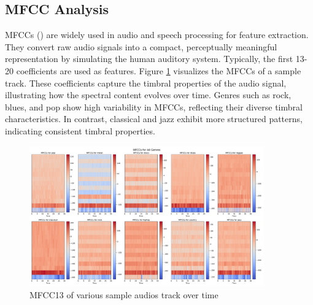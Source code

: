 \documentclass[11.5pt]{article}
\begin{document}
\subsection{MFCC Analysis}
MFCCs () are widely used in audio and speech processing for feature extraction. They convert raw audio signals into a compact, perceptually meaningful representation by simulating the human auditory system. Typically, the first 13-20 coefficients are used as features. Figure \ref{fig:mfcc} visualizes the MFCCs of a sample track. These coefficients capture the timbral properties of the audio signal, illustrating how the spectral content evolves over time. Genres such as rock, blues, and pop show high variability in MFCCs, reflecting their diverse timbral characteristics. In contrast, classical and jazz exhibit more structured patterns, indicating consistent timbral properties.
\begin{figure}[h]
    \centering
    \includegraphics[width=0.9\textwidth]{graphics/mfccs.pdf}
    \caption{MFCC13 of various sample audios track over time}
    \label{fig:mfcc}
\end{figure}
\end{document}
